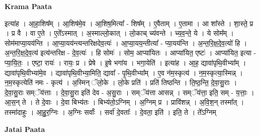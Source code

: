 \documentclass[17pt]{extarticle}
\begin{document}
\textbf{Krama Paata} \newline

इत्या॑ह । आ॒हा॒शिष᳚म् । आ॒शिष॑मे॒व । आ॒शिष॒मित्या᳚ - शिष᳚म् । ए॒वैताम् । ए॒तामा । आ शा᳚स्ते । शा॒स्ते॒ प्र । प्र वै । वा ए॒ते । ए॒ते᳚ऽस्मात् । अ॒स्माल्लो॒कात् । लो॒काच् च्य॑वन्ते । च्य॒व॒न्ते॒ ये । ये सोम᳚म् । सोम॑माप्या॒यय॑न्ति । आ॒प्या॒यय॑न्त्यन्तरिक्षदेव॒त्यः॑ । आ॒प्या॒यय॒न्तीत्या᳚ - प्या॒यय॑न्ति । अ॒न्त॒रि॒क्ष॒दे॒व॒त्यो॑ हि । अ॒न्त॒रि॒क्ष॒दे॒व॒त्य॑ इत्य॑न्तरिक्ष - दे॒व॒त्यः॑ । हि सोमः॑ । सोम॒ आप्या॑यितः । आप्या॑यित॒ एष्टः॑ । आप्या॑यित॒ इत्या - प्या॒यि॒तः॒ । एष्टा॒ रायः॑ । रायः॒ प्र । प्रेषे । इ॒षे भगा॑य । भगा॒येति॑ । इत्या॑ह । आ॒ह॒ द्यावा॑पृथि॒वीभ्या᳚म् । द्यावा॑पृथि॒वीभ्या॑मे॒व । द्यावा॑पृथि॒वीभ्या॒मिति॒ द्यावा᳚ - पृ॒थि॒वीभ्या᳚म् । ए॒व न॑म॒स्कृत्य॑ । न॒म॒स्कृत्या॒स्मिन्न् । न॒म॒स्कृत्येति॑ नमः - कृत्य॑ । अ॒स्मिन् ॅलो॒के । लो॒के प्रति॑ । प्रति॑ तिष्ठन्ति । ति॒ष्ठ॒न्ति॒ दे॒वा॒सु॒राः । दे॒वा॒सु॒राः सम्ॅय॑त्ताः । दे॒वा॒सु॒रा इति॑ देव - अ॒सु॒राः । सम्ॅय॑त्ता आसन्न् । सम्ॅय॑त्ता॒ इति॒ सम् - य॒त्ताः॒ । आ॒स॒न् ते । ते दे॒वाः । दे॒वा बिभ्य॑तः । बिभ्य॑तो॒ऽग्निम् । अ॒ग्निम् प्र । प्रावि॑शन्न् । अ॒वि॒श॒न् तस्मा᳚त् । तस्मा॑दाहुः । आ॒हु॒र॒ग्निः । अ॒ग्निः सर्वाः᳚ । सर्वा॑ दे॒वताः᳚ । दे॒वता॒ इति॑ । इति॒ ते । ते᳚ऽग्निम् \newline

\textbf{Jatai Paata} \newline
\end{document}
